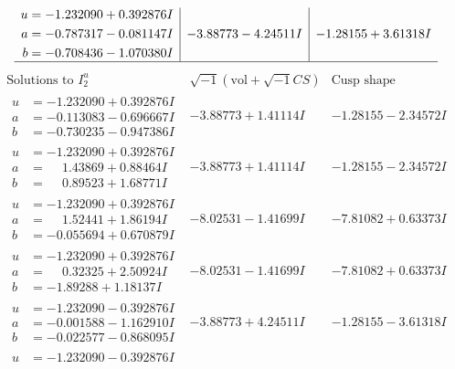 \documentclass[1p]{elsarticle_modified}
\theoremstyle{definition}
\newcommand{\I}{\sqrt{-1}}
\begin{document}
$$\begin{array}{c|c|c}
\begin{aligned}
u &= -1.232090 + 0.392876 I \\
a &= -0.787317 - 0.081147 I \\
b &= -0.708436 - 1.070380 I\end{aligned}
 & -3.88773 - 4.24511 I & -1.28155 + 3.61318 I\\
 \hline 
 \end{array}$$\newpage$$\begin{array}{c|c|c}  
\text{Solutions to }I^u_{2}& \I (\text{vol} + \sqrt{-1}CS) & \text{Cusp shape}\\
 \hline 
\begin{aligned}
u &= -1.232090 + 0.392876 I \\
a &= -0.113083 - 0.696667 I \\
b &= -0.730235 - 0.947386 I\end{aligned}
 & -3.88773 + 1.41114 I & -1.28155 - 2.34572 I \\ \hline\begin{aligned}
u &= -1.232090 + 0.392876 I \\
a &= \phantom{-}1.43869 + 0.88464 I \\
b &= \phantom{-}0.89523 + 1.68771 I\end{aligned}
 & -3.88773 + 1.41114 I & -1.28155 - 2.34572 I \\ \hline\begin{aligned}
u &= -1.232090 + 0.392876 I \\
a &= \phantom{-}1.52441 + 1.86194 I \\
b &= -0.055694 + 0.670879 I\end{aligned}
 & -8.02531 - 1.41699 I & -7.81082 + 0.63373 I \\ \hline\begin{aligned}
u &= -1.232090 + 0.392876 I \\
a &= \phantom{-}0.32325 + 2.50924 I \\
b &= -1.89288 + 1.18137 I\end{aligned}
 & -8.02531 - 1.41699 I & -7.81082 + 0.63373 I \\ \hline\begin{aligned}
u &= -1.232090 - 0.392876 I \\
a &= -0.001588 - 1.162910 I \\
b &= -0.022577 - 0.868095 I\end{aligned}
 & -3.88773 + 4.24511 I & -1.28155 - 3.61318 I \\ \hline\begin{aligned}
u &= -1.232090 - 0.392876 I \\

\end{aligned}
\end{array}$$
\end{document}

